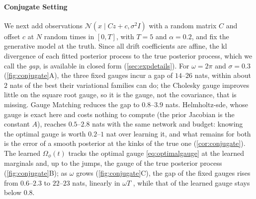 \documentclass{article} %
\newcommand{\gauge}{\Omega}
\newcommand{\Norm}{\mathcal{N}}
\begin{document}
\paragraph{Conjugate Setting}
We next add observations $\Norm(x \mid C z + c, \sigma^2 I)$ with a random matrix $C$ and offset $c$ at $N$ random times in $[0, T]$, with $T = 5$ and $\alpha = 0.2$, and fix the generative model at the truth. Since all drift coefficients are affine, the \gls{kl} divergence of each fitted posterior process to the true posterior process, which we call the \emph{gap}, is available in closed form (\cref{sec:expdetails}). For $\omega = 2\pi$ and $\sigma = 0.3$ (\cref{fig:conjugate}A), the three fixed gauges incur a gap of $14$--$26$ nats, within about $2$ nats of the best their variational families can do; the Cholesky gauge improves little on the square root gauge, so it is the gauge, not the covariance, that is missing. Gauge Matching reduces the gap to $0.8$--$3.9$ nats. Helmholtz-\gls{sde}, whose gauge is exact here and costs nothing to compute (the prior Jacobian is the constant $A$), reaches $0.5$--$2.8$ nats with the same network and budget: knowing the optimal gauge is worth $0.2$--$1$ nat over learning it, and what remains for both is the error of a smooth posterior at the kinks of the true one (\cref{cor:conjugate}). The learned $\gauge_\phi(t)$ tracks the optimal gauge \cref{eq:optimalgauge} at the learned marginals and, up to the jumps, the gauge of the true posterior process (\cref{fig:conjugate}B); as $\omega$ grows (\cref{fig:conjugate}C), the gap of the fixed gauges rises from $0.6$--$2.3$ to $22$--$23$ nats, linearly in $\omega T$ \citep[Theorem 4]{smith2026closing}, while that of the learned gauge stays below $0.8$.
\end{document}
